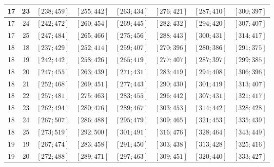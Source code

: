 \documentclass[a4paper,12pt]{article}
\begin{document}
\begin{center}
{\begin{longtable}[H]{|c|c|c|c|c|c|c|c|}
17 &  23 &  $\left[ 238; 459\right]$ &  $\left[ 255; 442\right]$ &  $\left[ 263; 434\right]$ &  $\left[ 276; 421\right]$ &  $\left[ 287; 410\right]$ &  $\left[ 300; 397\right]$ \tabularnewline \hline
17 &  24 &  $\left[ 242; 472\right]$ &  $\left[ 260; 454\right]$ &  $\left[ 269; 445\right]$ &  $\left[ 282; 432\right]$ &  $\left[ 294; 420\right]$ &  $\left[ 307; 407\right]$ \tabularnewline \hline
17 &  25 &  $\left[ 247; 484\right]$ &  $\left[ 265; 466\right]$ &  $\left[ 275; 456\right]$ &  $\left[ 288; 443\right]$ &  $\left[ 300; 431\right]$ &  $\left[ 314; 417\right]$ \tabularnewline \hline
18 &  18 &  $\left[ 237; 429\right]$ &  $\left[ 252; 414\right]$ &  $\left[ 259; 407\right]$ &  $\left[ 270; 396\right]$ &  $\left[ 280; 386\right]$ &  $\left[ 291; 375\right]$ \tabularnewline \hline
18 &  19 &  $\left[ 242; 442\right]$ &  $\left[ 258; 426\right]$ &  $\left[ 265; 419\right]$ &  $\left[ 277; 407\right]$ &  $\left[ 287; 397\right]$ &  $\left[ 299; 385\right]$ \tabularnewline \hline
18 &  20 &  $\left[ 247; 455\right]$ &  $\left[ 263; 439\right]$ &  $\left[ 271; 431\right]$ &  $\left[ 283; 419\right]$ &  $\left[ 294; 408\right]$ &  $\left[ 306; 396\right]$ \tabularnewline \hline
18 &  21 &  $\left[ 252; 468\right]$ &  $\left[ 269; 451\right]$ &  $\left[ 277; 443\right]$ &  $\left[ 290; 430\right]$ &  $\left[ 301; 419\right]$ &  $\left[ 313; 407\right]$ \tabularnewline \hline
18 &  22 &  $\left[ 257; 481\right]$ &  $\left[ 275; 463\right]$ &  $\left[ 283; 455\right]$ &  $\left[ 296; 442\right]$ &  $\left[ 307; 431\right]$ &  $\left[ 321; 417\right]$ \tabularnewline \hline
18 &  23 &  $\left[ 262; 494\right]$ &  $\left[ 280; 476\right]$ &  $\left[ 289; 467\right]$ &  $\left[ 303; 453\right]$ &  $\left[ 314; 442\right]$ &  $\left[ 328; 428\right]$ \tabularnewline \hline
18 &  24 &  $\left[ 267; 507\right]$ &  $\left[ 286; 488\right]$ &  $\left[ 295; 479\right]$ &  $\left[ 309; 465\right]$ &  $\left[ 321; 453\right]$ &  $\left[ 335; 439\right]$ \tabularnewline \hline
18 &  25 &  $\left[ 273; 519\right]$ &  $\left[ 292; 500\right]$ &  $\left[ 301; 491\right]$ &  $\left[ 316; 476\right]$ &  $\left[ 328; 464\right]$ &  $\left[ 343; 449\right]$ \tabularnewline \hline
19 &  19 &  $\left[ 267; 474\right]$ &  $\left[ 283; 458\right]$ &  $\left[ 291; 450\right]$ &  $\left[ 303; 438\right]$ &  $\left[ 313; 428\right]$ &  $\left[ 325; 416\right]$ \tabularnewline \hline
19 &  20 &  $\left[ 272; 488\right]$ &  $\left[ 289; 471\right]$ &  $\left[ 297; 463\right]$ &  $\left[ 309; 451\right]$ &  $\left[ 320; 440\right]$ &  $\left[ 333; 427\right]$ \tabularnewline \hline

\end{longtable}}
\end{center}
\end{document}
